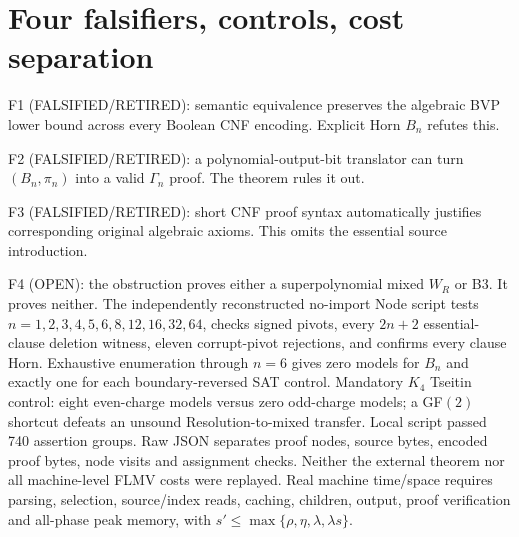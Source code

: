 \documentclass[11pt]{article}
\begin{document}
\section*{Four falsifiers, controls, cost separation}
\noindent F1 (FALSIFIED/RETIRED): semantic equivalence preserves the algebraic BVP lower bound across every Boolean CNF encoding. Explicit Horn $B_n$ refutes this.
\par\noindent F2 (FALSIFIED/RETIRED): a polynomial-output-bit translator can turn $(B_n,\pi_n)$ into a valid $\Gamma_n$ proof. The theorem rules it out.
\par\noindent F3 (FALSIFIED/RETIRED): short CNF proof syntax automatically justifies corresponding original algebraic axioms. This omits the essential source introduction.
\par\noindent F4 (OPEN): the obstruction proves either a superpolynomial mixed $W_R$ or B3. It proves neither.
The independently reconstructed no-import Node script tests $n=1,2,3,4,5,6,8,12,16,32,64$, checks signed pivots, every $2n+2$ essential-clause deletion witness, eleven corrupt-pivot rejections, and confirms every clause Horn. Exhaustive enumeration through $n=6$ gives zero models for $B_n$ and exactly one for each boundary-reversed SAT control. Mandatory $K_4$ Tseitin control: eight even-charge models versus zero odd-charge models; a GF$(2)$ shortcut defeats an unsound Resolution-to-mixed transfer. Local script passed 740 assertion groups. Raw JSON separates proof nodes, source bytes, encoded proof bytes, node visits and assignment checks. Neither the external theorem nor all machine-level FLMV costs were replayed. Real machine time/space requires parsing, selection, source/index reads, caching, children, output, proof verification and all-phase peak memory, with $s'\le\max\{\rho,\eta,\lambda,\lambda s\}$.
\end{document}
